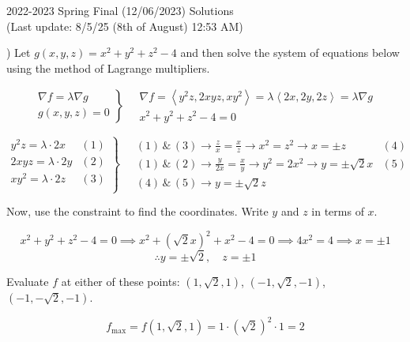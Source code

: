 \documentclass{article}
\begin{document}
\newpage

\begin{center}
2022-2023 Spring Final (12/06/2023) Solutions\\
(Last update: 8/5/25 (8th of August) 12:53 AM)
\end{center}

) Let $g(x,y,z)=x^2+y^2+z^2-4$ and then solve the system of equations below using the method of Lagrange multipliers.

\[
\left.
\begin{array}{ll}
\displaystyle\nabla f =\lambda \nabla g \\
\displaystyle g(x,y,z) = 0
\end{array}
\right\}\quad
\begin{array}{ll}
\nabla f = \left\langle y^2z,2xyz,xy^2\right\rangle = \lambda\left\langle2x,2y,2z\right\rangle = \lambda\nabla g \\[0.2cm] x^2+y^2+z^2-4=0
\end{array}
\]

\[
\left.
\begin{array}{ll}
\displaystyle y^2z =\lambda \cdot2x & (1)\\[0.2cm]
\displaystyle 2xyz =\lambda \cdot2y & (2)\\[0.2cm]
\displaystyle xy^2 =\lambda \cdot2z & (3)\\[0.2cm]
\end{array}
\right\}\quad
\begin{array}{ll}
\displaystyle(1)\,\&\,(3)\rightarrow\frac{z}{x}=\frac{x}{z}\rightarrow x^2=z^2\rightarrow x=\pm z&(4)\\[0.4cm]
\displaystyle(1)\,\&\,(2)\rightarrow\frac{y}{2x}=\frac{x}{y}\rightarrow y^2=2x^2\rightarrow y=\pm\sqrt{2}x&(5)\\[0.4cm]\displaystyle(4)\,\&\,(5)\rightarrow y=\pm \sqrt 2z
\end{array}
\]

\hfill

\noindent Now, use the constraint to find the coordinates. Write $y$ and $z$ in terms of $x$.

\[x^2+y^2+z^2-4=0\implies x^2+\left(\sqrt2x\right)^2+x^2-4=0\implies4x^2=4\implies x=\pm1\]
\[\therefore y=\pm\sqrt2,\quad z=\pm1\]

\hfill

\noindent Evaluate $f$ at either of these points: $(1,\sqrt2,1)$, $(-1,\sqrt2,-1)$, $(-1,-\sqrt2,-1)$.

\[f_{\text{max}}=f(1,\sqrt2,1)=1\cdot\left(\sqrt2\right)^2\cdot1=\boxed{2}\]
\end{document}
